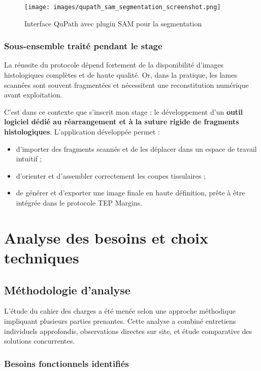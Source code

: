 \documentclass[12pt,a4paper]{report}
\begin{document}
\begin{figure}[h!]
\centering
\texttt{[image: images/qupath\_sam\_segmentation\_screenshot.png]}
\caption{Interface QuPath avec plugin SAM pour la segmentation}
\end{figure}

\subsection{Sous-ensemble traité pendant le stage}

La réussite du protocole dépend fortement de la disponibilité d'images histologiques complètes et de haute qualité. Or, dans la pratique, les lames scannées sont souvent fragmentées et nécessitent une reconstitution numérique avant exploitation.

C'est dans ce contexte que s'inscrit mon stage : le développement d'un \textbf{outil logiciel dédié au réarrangement et à la suture rigide de fragments histologiques}. L'application développée permet :

\begin{itemize}
\item d'importer des fragments scannés et de les déplacer dans un espace de travail intuitif ;
\item d'orienter et d'assembler correctement les coupes tissulaires ;
\item de générer et d'exporter une image finale en haute définition, prête à être intégrée dans le protocole TEP Margins.
\end{itemize}

\chapter{Analyse des besoins et choix techniques}

\section{Méthodologie d'analyse}

L'étude du cahier des charges a été menée selon une approche méthodique impliquant plusieurs parties prenantes. Cette analyse a combiné entretiens individuels approfondis, observations directes sur site, et étude comparative des solutions concurrentes.

\subsection{Besoins fonctionnels identifiés}
\end{document}
